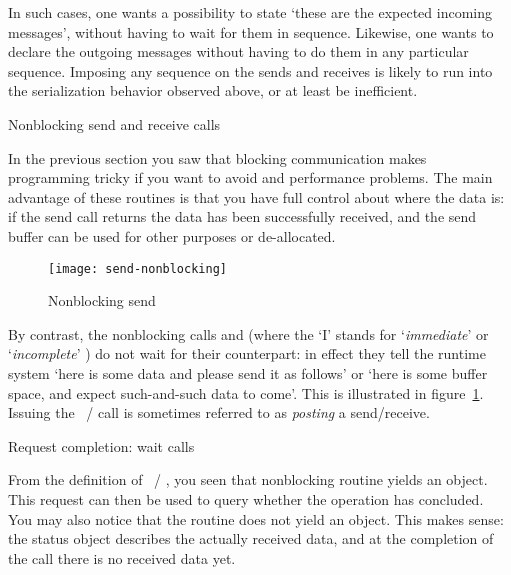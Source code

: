 In such cases, one wants a possibility to state `these are the expected incoming
messages', without having to wait for them in sequence. Likewise, one wants to declare
the outgoing messages without having to do them in any particular sequence.
Imposing any sequence on the sends and receives is likely to run into the serialization
behavior observed above, or at least be inefficient.

 {Nonblocking send and receive calls}
\label{sec:nonblocking}

In the previous section you saw that blocking communication makes
programming tricky if you want to avoid  and performance
problems. The main advantage of these routines is that you have full
control about where the data is: if the send call returns
the data has been successfully received, and the send buffer can be used for
other purposes or de-allocated.  

\begin{figure}[ht]
  \texttt{[image: send-nonblocking]}
  \caption{Nonblocking send}
  \label{fig:send-nonblocking}
\end{figure}

By contrast, the nonblocking calls
 and 
(where the `I' stands for
`\emph{immediate}'
or
`\emph{incomplete}'
)
do not wait for their counterpart: in effect
they tell the runtime system `here is some data and please send it as
follows' or `here is some buffer space, and expect such-and-such data
to come'.  This is illustrated in figure~\ref{fig:send-nonblocking}.
%
%
Issuing the ~/ 
call is sometimes referred to as
\emph{posting}
a send/receive.

 {Request completion: wait calls}
\label{sec:waittest}

From the definition of ~/
, you seen that nonblocking routine yields
an  object. This request can then be used to
query whether the operation has concluded. You may also notice that
the  routine does not yield an
 object.  This makes sense: the status object
describes the actually received data, and at the completion of the
 call there is no received data yet.

